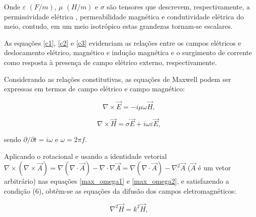 Onde $\varepsilon$ $(F/m)$, $\mu$ $(H/m)$ e $\sigma$ são tensores que descrevem, respectivamente, a permissividade elétrica , permeabilidade magnética  e condutividade elétrica do meio, contudo, em um meio isotrópico estas grandezas tornam-se escalares.

As equações \eqref{c1}, \eqref{c2} e \eqref{c3} evidenciam as relações entre os campos elétricos e deslocamento elétrico, magnético e indução magnética e o surgimento de corrente como resposta à presença de campo elétrico externo, respectivamente.

Considerando as relações constitutivas, as equações de Maxwell podem ser expressas em termos de campo elétrico e campo magnético:

\begin{equation}
\nabla\times\vec{E} = -i\mu \omega \vec{H},
\label{max_omega1}
\end{equation}


\begin{equation}
\nabla\times\vec{H} = \sigma\vec{E} + i\omega\varepsilon\vec{E},
\label{max_omega2}
\end{equation}

sendo $\partial/\partial t= i\omega$ e $\omega=2\pi f$.



Aplicando o rotacional e usando a identidade vetorial $\nabla \times (\nabla \times\vec{A}) = \nabla(\nabla \cdot \vec{A}) - \nabla\cdot\nabla \vec{A}= \nabla(\nabla \cdot \vec{A}) - \nabla^{2}\vec{A}$ ($\vec{A}$ é um vetor arbitrário) nas equações \eqref{max_omega1} e \eqref{max_omega2}, e satisfazendo a condição (6), obtêm-se as equações da difusão dos campos eletromagnéticos:

\begin{equation}
\nabla^{2}\vec{H} = k^{2} \vec{H},
\label{eq_onda_freq1}
\end{equation}

